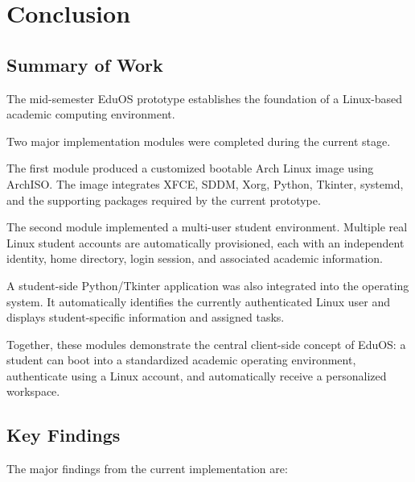 \documentclass{tietreport}
\begin{document}
\chapter{Conclusion}

\section{Summary of Work}

The mid-semester EduOS prototype establishes the foundation of a
Linux-based academic computing environment.

Two major implementation modules were completed during the current
stage.

The first module produced a customized bootable Arch Linux image
using ArchISO. The image integrates XFCE, SDDM, Xorg, Python,
Tkinter, systemd, and the supporting packages required by the
current prototype.

The second module implemented a multi-user student environment.
Multiple real Linux student accounts are automatically provisioned,
each with an independent identity, home directory, login session,
and associated academic information.

A student-side Python/Tkinter application was also integrated into
the operating system. It automatically identifies the currently
authenticated Linux user and displays student-specific information
and assigned tasks.

Together, these modules demonstrate the central client-side concept
of EduOS: a student can boot into a standardized academic operating
environment, authenticate using a Linux account, and automatically
receive a personalized workspace.


\section{Key Findings}

The major findings from the current implementation are:
\end{document}
